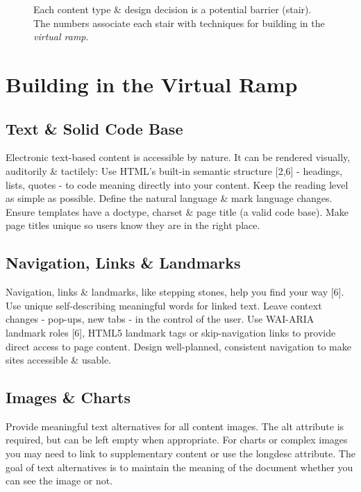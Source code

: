 \documentclass{acm_proc_article-sp}
\begin{document}
\begin{figure*}
\centering
{}
\caption{Each content type \& design decision is a potential barrier (stair). The numbers associate each stair with techniques for building in the \textit{virtual ramp}.}
\end{figure*}

\section{Building in the {\secit Virtual} Ramp}

\subsection{Text \& Solid Code Base}

Electronic text-based content is accessible by nature. It can be rendered visually, auditorily \& tactilely: Use HTML's built-in semantic structure [2,6] - headings, lists, quotes - to code meaning directly into your content. Keep the reading level as simple as possible. Define the natural language \& mark language changes. Ensure templates have a doctype, charset \& page title (a valid code base). Make page titles unique so users know they are in the right place.

\subsection{Navigation, Links \& Landmarks}
Navigation, links \& landmarks, like stepping stones, help you find your way [6]. Use unique self-describing meaningful words for linked text. Leave context changes - pop-ups, new tabs - in the control of the user. Use WAI-ARIA landmark roles [6], HTML5 landmark tags or skip-navigation links to provide direct access to page content. Design well-planned, consistent navigation to make sites accessible \& usable.

\subsection{Images \& Charts}
Provide meaningful text alternatives for all content images. The alt attribute is required, but can be left empty when appropriate. For charts or complex images you may need to link to supplementary content or use the longdesc attribute. The goal of text alternatives is to maintain the meaning of the document whether you can see the image or not.
\end{document}
